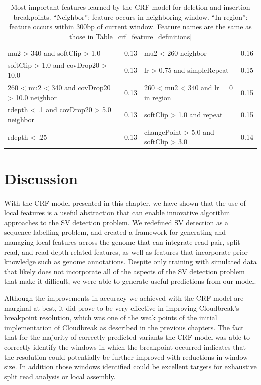 \begin{table}
\begin{centering}
{\begin{tabular}{|lr|lr|}
mu2 > 340 and softClip > 1.0 & 0.13 & mu2 < 260 neighbor & 0.16 \\
softClip > 1.0 and covDrop20 > 10.0 & 0.13 & lr > 0.75 and simpleRepeat & 0.15 \\
260 < mu2 < 340 and covDrop20 > 10.0 neighbor & 0.13 & 260 < mu2 < 340 and lr = 0 in region & 0.15 \\
rdepth < .1 and covDrop20 > 5.0 neighbor & 0.13 & softClip > 1.0 and repeat & 0.15 \\
rdepth < .25 & 0.13 & changePoint > 5.0 and softClip > 3.0 & 0.14 \\
\hline
\end{tabular}
}
\caption{Most important features learned by the CRF model for deletion and insertion breakpoints. ``Neighbor'': feature occurs in neighboring window. ``In region'': feature occurs within 300bp of current window. Feature names are the same as those in Table~\ref{crf_feature_definitions}}
\end{centering}
\label{crf_feature_selections}
\end{table}

\section{Discussion}

With the CRF model presented in this chapter, we have shown that the use of local features is a useful abstraction that can enable innovative algorithm approaches to the SV detection problem. We redefined SV detection as a sequence labelling problem, and created a framework for generating and managing local features across the genome that can integrate read pair, split read, and read depth related features, as well as features that incorporate prior knowledge such as genome annotations. Despite only training with simulated data that likely does not incorporate all of the aspects of the SV detection problem that make it difficult, we were able to generate useful predictions from our model.

Although the improvements in accuracy we achieved with the CRF model are marginal at best, it did prove to be very effective in improving Cloudbreak's breakpoint resolution, which was one of the weak points of the initial implementation of Cloudbreak as described in the previous chapters. The fact that for the majority of correctly predicted variants the CRF model was able to correctly identify the windows in which the breakpoint occurred indicates that the resolution could potentially be further improved with reductions in window size. In addition those windows identified could be excellent targets for exhaustive split read analysis or local assembly.

